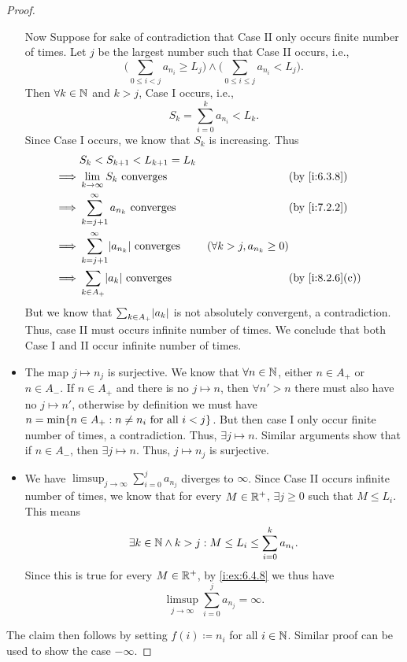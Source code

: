 \begin{proof}
\begin{itemize}
          Now Suppose for sake of contradiction that Case II only occurs finite number of times.
          Let \(j\) be the largest number such that Case II occurs, i.e.,
          \[
            \Bigg(\sum_{0 \leq i < j} a_{n_i} \geq L_j\Bigg) \land \Bigg(\sum_{0 \leq i \leq j} a_{n_i} < L_j\Bigg).
          \]
          Then \(\forall k \in \mathbb{N}\) and \(k > j\), Case I occurs, i.e.,
          \[
            S_k = \sum_{i = 0}^k a_{n_i} < L_k.
          \]
          Since Case I occurs, we know that \(S_k\) is increasing.
          Thus
          \begin{align*}
                     & S_k < S_{k + 1} < L_{k + 1} = L_k                                                                           \\
            \implies & \lim_{k \to \infty} S_k \text{ converges}               &                                 & \by{i:6.3.8}    \\
            \implies & \sum_{k = j + 1}^\infty a_{n_k} \text{ converges}       &                                 & \by{i:7.2.2}    \\
            \implies & \sum_{k = j + 1}^\infty \abs{a_{n_k}} \text{ converges} & (\forall k > j, a_{n_k} \geq 0)                   \\
            \implies & \sum_{k \in A_+} \abs{a_k} \text{ converges}            &                                 & \by{i:8.2.6}[c]
          \end{align*}
          But we know that \(\sum_{k \in A_+} \abs{a_k}\) is not absolutely convergent, a contradiction.
          Thus, case II must occurs infinite number of times.
          We conclude that both Case I and II occur infinite number of times.
    \item The map \(j \mapsto n_j\) is surjective.
          We know that \(\forall n \in \mathbb{N}\), either \(n \in A_+\) or \(n \in A_-\).
          If \(n \in A_+\) and there is no \(j \mapsto n\), then \(\forall n' > n\) there must also have no \(j \mapsto n'\), otherwise by definition we must have \(n = \min\set{n \in A_+ : n \neq n_i \text{ for all } i < j}\).
          But then case I only occur finite number of times, a contradiction.
          Thus, \(\exists j \mapsto n\).
          Similar arguments show that if \(n \in A_-\), then \(\exists j \mapsto n\).
          Thus, \(j \mapsto n_j\) is surjective.
    \item We have \(\limsup_{j \to \infty} \sum_{i = 0}^j a_{n_j}\) diverges to \(\infty\).
          Since Case II occurs infinite number of times, we know that for every \(M \in \mathbb{R}^+\), \(\exists j \geq 0\) such that \(M \leq L_i\).
          This means
          \[
            \exists k \in \mathbb{N} \land k > j : M \leq L_i \leq \sum_{i = 0}^k a_{n_i}.
          \]
          Since this is true for every \(M \in \mathbb{R}^+\), by \cref{i:ex:6.4.8} we thus have
          \[
            \limsup_{j \to \infty} \sum_{i = 0}^j a_{n_j} = \infty.
          \]
  \end{itemize}
  The claim then follows by setting \(f(i) \coloneqq n_i\) for all \(i \in \mathbb{N}\).
  Similar proof can be used to show the case \(-\infty\).
\end{proof}
